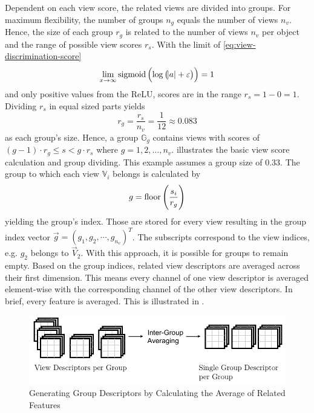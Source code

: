 Dependent on each view score, the related views are divided into groups.
For maximum flexibility, the number of groups $n_g$ equals the number of views $n_v$.
Hence, the size of each group $r_g$ is related to the number of views $n_v$ per object and the range of possible view scores $r_s$.
With the limit of \eqref{eq:view-discrimination-score}
\begin{equation}
	\lim_{x\rightarrow \infty} \operatorname{sigmoid}\left( \log \left( \abs{a} + \varepsilon \right) \right) = 1
\end{equation}
and only positive values from the ReLU, scores are in the range $r_s = 1 - 0 = 1$.
Dividing $r_s$ in equal sized parts yields
\begin{equation}
	r_g = \frac{r_s}{n_v} = \frac{1}{12} \approx 0.083
\end{equation}
as each group's size.
Hence, a group $\mathbb{G}_g$ contains views with scores of $(g-1) \cdot r_g \leq s < g \cdot r_s$ where $g = {1,2, \dots, n_v}$.
 illustrates the basic view score calculation and group dividing.
This example assumes a group size of $0.33$.
The group to which each view $\mathbb{V}_i$ belongs is calculated by
\begin{equation}
	g = \operatorname{floor} \left( \frac{s_i}{r_g} \right)
\end{equation}
yielding the group's index.
Those are stored for every view resulting in the group index vector $\vec{g} = \left( g_1, g_2, \cdots, g_{n_v}\right)^T$.
The subscripts correspond to the view indices, e.g. $g_2$ belongs to $\vec{V}_2$.
With this approach, it is possible for groups to remain empty.
Based on the group indices, related view descriptors are averaged across their first dimension.
This means every channel of one view descriptor is averaged element-wise with the corresponding channel of the other view descriptors.
In brief, every feature is averaged.
This is illustrated in .
\begin{figure}
	\centering
	\includegraphics[]{images/grouping_module_group_descriptors.pdf}
	\caption[Generating Group Descriptors]{Generating Group Descriptors by Calculating the Average of Related Features}
	\label{fig:grouping-module-group-descriptors}
\end{figure}
